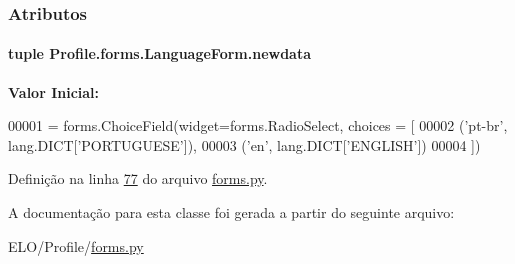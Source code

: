 \subsubsection{Atributos}
\hypertarget{classProfile_1_1forms_1_1LanguageForm_a327d764765fba9b8d9d82c86ca7e08a6}{
\paragraph[{newdata}]{\setlength{\rightskip}{0pt plus 5cm}tuple Profile.\-forms.\-Language\-Form.\-newdata\hspace{0.3cm}{\ttfamily [static]}}}\label{classProfile_1_1forms_1_1LanguageForm_a327d764765fba9b8d9d82c86ca7e08a6}
{\bfseries Valor Inicial\-:}
\begin{DoxyCode}
00001 = forms.ChoiceField(widget=forms.RadioSelect, choices = [
00002                                             (\textcolor{stringliteral}{'pt-br'}, lang.DICT[\textcolor{stringliteral}{'PORTUGUESE'}]),
00003                                             (\textcolor{stringliteral}{'en'}, lang.DICT[\textcolor{stringliteral}{'ENGLISH'}])
00004                                                 ])
\end{DoxyCode}


Definição na linha \hyperlink{Profile_2forms_8py_source_l00077}{77} do arquivo \hyperlink{Profile_2forms_8py_source}{forms.\-py}.



A documentação para esta classe foi gerada a partir do seguinte arquivo\-:\begin{DoxyCompactItemize}
\item 
E\-L\-O/\-Profile/\hyperlink{Profile_2forms_8py}{forms.\-py}\end{DoxyCompactItemize}
